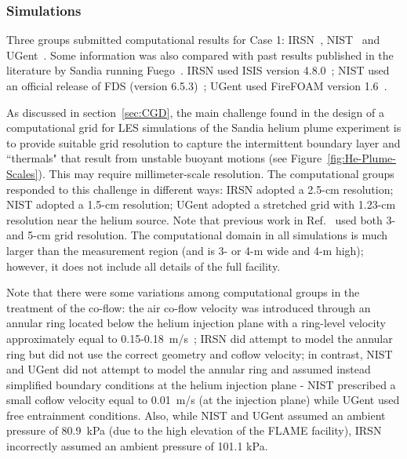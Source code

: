 \subsubsection{Simulations}

Three groups submitted computational results for Case 1:  IRSN~\cite{Case1_SIM_IRSN}, NIST~\cite{Case1_SIM_NIST} and UGent~\cite{Case1_SIM_UGent}. Some information was also compared with past results published in the literature by Sandia running Fuego~\cite{DesJardin:2004}. IRSN used ISIS version 4.8.0~\cite{ISIS}; NIST used an official release of FDS (version 6.5.3)~\cite{FDS}; UGent used FireFOAM version 1.6~\cite{FireFOAM}.

As discussed in section~\ref{sec:CGD}, the main challenge found in the design of a computational grid for LES simulations of the Sandia helium plume experiment is to provide suitable grid resolution to capture the intermittent boundary layer and ``thermals" that result from unstable buoyant motions (see Figure~\ref{fig:He-Plume-Scales}). This may require millimeter-scale resolution. The computational groups responded to this challenge in different ways: IRSN adopted a 2.5-cm resolution; NIST adopted a 1.5-cm resolution; UGent adopted a stretched grid with 1.23-cm resolution near the helium source. Note that previous work in Ref.~\cite{DesJardin:2004} used both 3- and 5-cm grid resolution. The computational domain in all simulations is much larger than the measurement region (and is 3- or 4-m wide and 4-m high); however, it does not include all details of the full facility. 

Note that there were some variations among computational groups in the treatment of the co-flow: the air co-flow velocity was introduced through an annular ring located below the helium injection plane with a ring-level velocity approximately equal to 0.15-0.18~m/s~\cite{Blanchat:2001}; IRSN did attempt to model the annular ring but did not use the correct geometry and coflow velocity; in contrast, NIST and UGent did not attempt to model the annular ring and assumed instead simplified boundary conditions at the helium injection plane \-- NIST prescribed a small coflow velocity equal to 0.01~m/s (at the injection plane) while UGent used free entrainment conditions. Also, while NIST and UGent assumed an ambient pressure of 80.9~kPa (due to the high elevation of the FLAME facility), IRSN incorrectly assumed an ambient pressure of 101.1 kPa.

